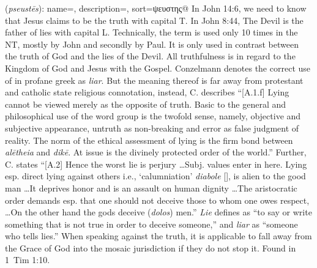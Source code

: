 \item[Liar,]

(\textit{pseustēs}):
{
    name=,
    description={},
    sort=ψευστης@
}
In John 14:6, we need to know that Jesus claims to be the truth with capital T. In John 8:44, The Devil is the father of lies with capital L. Technically, the term  is used only 10 times in the NT, mostly by John and secondly by Paul. It is only used in contrast between the truth of God and the lies of the Devil. All truthfulness is in regard to the Kingdom of God and Jesus with the Gospel. 
Conzelmann denotes the correct use of  in profane greek as \emph{liar}. But the meaning thereof is far away from protestant and catholic state religious connotation, instead, C. describes ``[A.1.f] Lying cannot be viewed merely as the opposite of truth. Basic to the general and philosophical use of the word group is the twofold sense, namely, objective and subjective appearance, untruth as non-breaking and error as false judgment of reality. The norm of the ethical assessment of lying is the firm bond between \emph{alētheia} and \emph{dikē}. At issue is the divinely protected order of the world.'' 
Further, C. states ``[A.2] Hence the worst lie is perjury \ldots Subj. values enter in here. Lying esp. direct lying against others i.e., `calumniation' \emph{diabole} [], is alien to the good man \ldots It deprives honor and is an assault on human dignity \ldots The aristocratic order demands esp. that one should not deceive those to whom one owes respect, \ldots On the other hand the gods deceive (\emph{dolos}) men.''
\emph{Lie} defines as ``to say or write something that is not true in order to deceive someone,'' and \emph{liar} as ``someone who tells lies.'' When speaking against the truth, it is applicable to fall away from the Grace of God into the mosaic jurisdiction if they do not stop it.
Found in 1~Tim 1:10.
